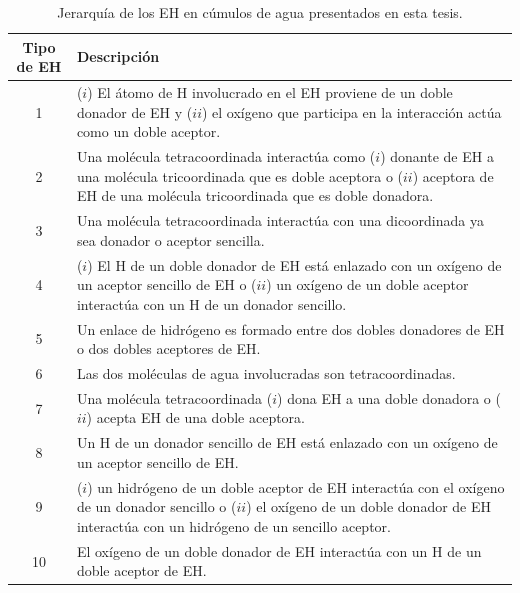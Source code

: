 \begin{table}[htbp]
  \begin{center}
    \caption{Jerarquía de los EH en cúmulos de agua presentados en esta tesis.}
    \begin{tabular}{c||p{12.5cm}}
      Tipo de EH & Descripción \\ \hline\hline
      1 & ($i$) El átomo de H involucrado en el EH proviene de un doble donador de EH
          y ($ii$) el oxígeno que participa en la interacción actúa como un doble aceptor.\\ \hline
      2 & Una molécula tetracoordinada interactúa como ($i$) donante de EH a una molécula
          tricoordinada que es doble aceptora o ($ii$) aceptora de EH de una molécula tricoordinada
          que es doble donadora. \\ \hline
      3 & Una molécula tetracoordinada interactúa con una dicoordinada ya sea donador
          o aceptor sencilla. \\ \hline
      4 & ($i$) El H de un doble donador de EH está enlazado con un oxígeno de un aceptor
          sencillo de EH o ($ii$) un oxígeno de un doble aceptor interactúa con un H
          de un donador sencillo. \\ \hline
      5 & Un enlace de hidrógeno es formado entre dos dobles donadores
          de EH o dos dobles aceptores de EH. \\ \hline
      6 & Las dos moléculas de agua involucradas son tetracoordinadas.\\ \hline
      7 & Una molécula tetracoordinada ($i$) dona EH a una doble
          donadora o ($ii$) acepta EH de una doble aceptora. \\ \hline
      8 & Un H de un donador sencillo de EH está enlazado con un oxígeno
          de un aceptor sencillo de EH. \\ \hline
      9 & ($i$) un hidrógeno de un doble aceptor de EH interactúa con el oxígeno
          de un donador sencillo o ($ii$) el oxígeno de un doble donador de EH
          interactúa con un hidrógeno de un sencillo aceptor. \\ \hline
      10 & El oxígeno de un doble donador de EH interactúa con un H de 
          un doble aceptor de EH. \\ 
    \end{tabular}
    \label{scale2020}
  \end{center}
\end{table}

